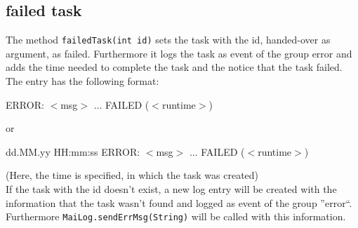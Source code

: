 \documentclass{article}
\begin{document}
    \subsection{failed task}
    \label{task_failedTask}
    The method \lstinline|failedTask(int id)| sets the task with the id, handed-over as argument, as failed.
    Furthermore it logs the task as event of the group error and adds the time needed to complete the task and the notice that the task failed.
    The entry has the following format:
    \begin{description}
        \item ERROR: $<$msg$>$ ... FAILED ($<$runtime$>$)
        \item or
        \item dd.MM.yy HH:mm:ss ERROR: $<$msg$>$ ... FAILED ($<$runtime$>$)
    \end{description}
    (Here, the time is specified, in which the task was created) \\
    If the task with the id doesn't exist, a new log entry will be created with the information that the task wasn't found and logged as event of the group ''error``.
    Furthermore \lstinline|MaiLog.sendErrMsg(String)| will be called with this information.

\section{}
\end{document}
